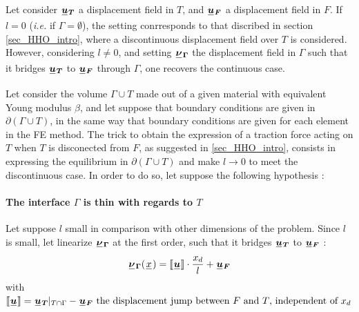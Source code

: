 \documentclass[fleqn]{article}
\begin{document}
            Let consider $\tensori{u}\subscript{\bm{T}}$ a displacement field in $T$, and $\tensori{u}\subscript{\bm{F}}$ a displacement field in $F$. If $l=0$ (\textit{i.e.} if $\Gamma = \emptyset$), the setting conrresponds to that discribed in section \ref{sec_HHO_intro}, where a discontinuous displacement field over $T$ is considered.
            However, considering $l \neq 0$, and setting $\tensori{\nu}\subscript{\bm{\Gamma}}$ the displacement field in $\Gamma$ such that it bridges $\tensori{u}\subscript{\bm{T}}$ to $\tensori{u}\subscript{\bm{F}}$ through $\Gamma$, one recovers the continuous case.

            Let consider the volume $\Gamma \cup T$ made out of a given material with equivalent Young modulus $\beta$, and let suppose that boundary conditions are given in $\partial(\Gamma \cup T)$, in the same way that boundary conditions are given for each element in the FE method. The trick to obtain the expression of a traction force acting on $T$ when $T$ is disconected from $F$, as suggested in \ref{sec_HHO_intro}, consists in expressing the equilibrium in $\partial(\Gamma \cup T)$ and make $l \rightarrow 0$ to meet the discontinuous case.
            In order to do so, let suppose the following hypothesis :

            \paragraph{The interface $\Gamma$ is thin with regards to $T$}
            Let suppose $l$ small in comparison with other dimensions of the problem. Since $l$ is small, let
            linearize $\tensori{\nu}\subscript{\bm{\Gamma}}$ at the first order, such that it bridges $\tensori{u}\subscript{\bm{T}}$ to $\tensori{u}\subscript{\bm{F}}$ :
            \begin{equation}
                \tensori{\nu}\subscript{\bm{\Gamma}}(\lighttensori{x}) = \llbracket \tensori{u} \rrbracket \cdot \frac{x_d}{l} + \tensori{u}\subscript{\bm{F}}
            \end{equation}
            with $\llbracket \tensori{u} \rrbracket = \tensori{u}\subscript{\bm{T}}\vert_{T \cap\Gamma} - \tensori{u}\subscript{\bm{F}}
            \mbox{ the displacement jump between $F$ and $T$, independent of $x_d$}$
\end{document}
